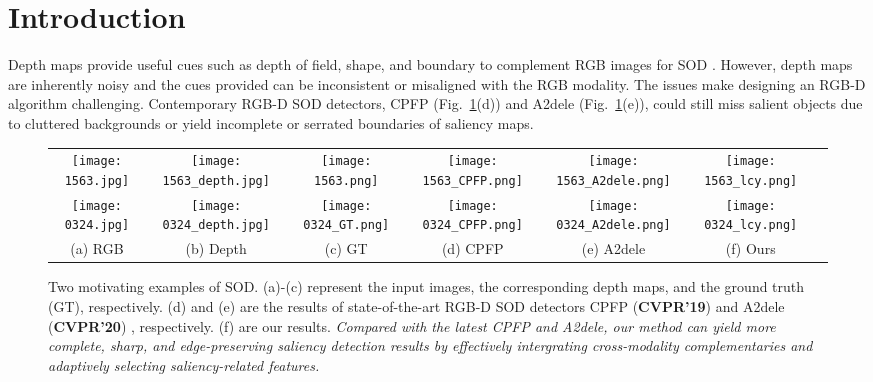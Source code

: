 \documentclass[runningheads]{llncs}
\begin{document}
\section{Introduction}

Depth maps provide useful cues such as depth of field, shape, and boundary to complement RGB images for SOD \cite{PCFN,TAN,MMCI,DMRA,A2dele,CPFP}.
However, depth maps are inherently noisy and the cues provided can be inconsistent or misaligned with the RGB modality.
The issues make designing an RGB-D algorithm challenging. Contemporary RGB-D SOD detectors, CPFP \cite{CPFP} (Fig.~\ref{fig:example}(d)) and A2dele \cite{A2dele} (Fig.~\ref{fig:example}(e)), could still miss salient objects due to cluttered backgrounds or yield incomplete or serrated boundaries of saliency maps.

\begin{figure}
	\begin{center}
		\begin{tabular}{c@{ }c@{ }c@{ }c@{ }c@{ }c@{ }c}
			\texttt{[image: 1563.jpg]}&
			\texttt{[image: 1563\_depth.jpg]}&
			\texttt{[image: 1563.png]}&
			\texttt{[image: 1563\_CPFP.png]}&
			\texttt{[image: 1563\_A2dele.png]}&
			\texttt{[image: 1563\_lcy.png]}\\
			\texttt{[image: 0324.jpg]}&
			\texttt{[image: 0324\_depth.jpg]}&
			\texttt{[image: 0324\_GT.png]}&
			\texttt{[image: 0324\_CPFP.png]}&
			\texttt{[image: 0324\_A2dele.png]}&
			\texttt{[image: 0324\_lcy.png]}\\
			(a) RGB & (b) Depth & (c) GT &  (d)  CPFP  & (e) A2dele  & (f) Ours \\
		\end{tabular}
	\end{center}
	\caption{Two motivating examples of SOD. (a)-(c) represent the input images, the corresponding depth maps, and the ground truth (GT), respectively. (d) and (e) are the results of state-of-the-art RGB-D SOD detectors  CPFP (\textbf{CVPR'19})  \cite{CPFP} and A2dele (\textbf{CVPR'20}) \cite{A2dele}, respectively. (f) are our results. \emph{Compared with the latest  CPFP and A2dele, our method can yield more complete, sharp, and edge-preserving saliency detection results by effectively intergrating cross-modality complementaries and adaptively selecting saliency-related features.}}
	\label{fig:example}
\end{figure}
\end{document}
